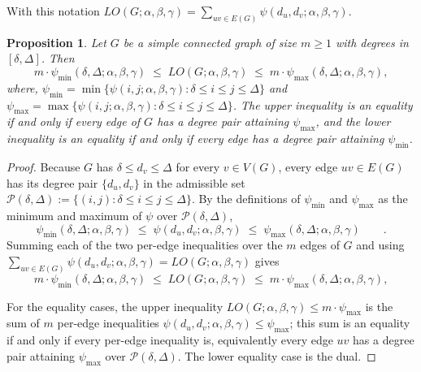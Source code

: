 \documentclass[a5paper, 10pt]{article}
\theoremstyle{plain}
\newtheorem{proposition}[theorem]{Proposition}
\theoremstyle{remark}
\theoremstyle{definition}
\newcommand{\Wuzi}{LO(G;\alpha,\beta,\gamma)}
\begin{document}
  With this notation $\Wuzi = \sum_{uv \in E(G)} \psi(d_u, d_v; \alpha,
  \beta, \gamma)$.

  \begin{proposition}\label{thm:bracket}
  Let $G$ be a simple connected graph of size $m \ge 1$ with
  degrees in $[\delta, \Delta]$. Then
  \begin{equation}\label{eq:bracket}
  m \cdot \psi_{\min}(\delta, \Delta; \alpha, \beta, \gamma)
  \;\le\; \Wuzi \;\le\;
  m \cdot \psi_{\max}(\delta, \Delta; \alpha, \beta, \gamma),
  \end{equation}
  where,
  $\psi_{\min} = \min\{\psi(i, j; \alpha, \beta, \gamma)
                : \delta \le i \le j \le \Delta\}$
  and $\psi_{\max} = \max\{\psi(i, j; \alpha, \beta, \gamma)
                : \delta \le i \le j \le \Delta\}$. The upper
  inequality is an equality if and only if every edge of $G$ has a
  degree pair attaining $\psi_{\max}$, and the lower
  inequality is an equality if and only if every edge has a degree
  pair attaining $\psi_{\min}$.
  \end{proposition}

  \begin{proof}
  Because $G$ has $\delta \le d_v \le \Delta$ for every
  $v \in V(G)$, every edge $uv \in E(G)$ has its degree
  pair $\{d_u, d_v\}$ in the admissible set
  $\mathcal{P}(\delta, \Delta) := \{(i, j) : \delta \le i \le j \le
  \Delta\}$.
  By the definitions of $\psi_{\min}$ and $\psi_{\max}$ as the
  minimum and maximum of $\psi$ over $\mathcal{P}(\delta, \Delta)$,
  \[
  \psi_{\min}(\delta, \Delta; \alpha, \beta, \gamma)
  \;\le\;
  \psi(d_u, d_v; \alpha, \beta, \gamma)
  \;\le\;
  \psi_{\max}(\delta, \Delta; \alpha, \beta, \gamma)
  \qquad. \]
  Summing each of the two per-edge inequalities over the $m$ edges
  of $G$ and using $\sum_{uv \in E(G)} \psi(d_u, d_v; \alpha, \beta,
  \gamma) = \Wuzi$
  gives
  \[
  m \cdot \psi_{\min}(\delta, \Delta; \alpha, \beta, \gamma)
  \;\le\;
  \Wuzi
  \;\le\;
  m \cdot \psi_{\max}(\delta, \Delta; \alpha, \beta, \gamma),
  \]

  For the equality cases, the upper inequality
  $\Wuzi \le m \cdot \psi_{\max}$ is the sum of $m$ per-edge
  inequalities $\psi(d_u, d_v; \alpha, \beta, \gamma) \le \psi_{\max}$;
  this sum is an equality if and only if every per-edge inequality
  is, equivalently every edge $uv$ has a degree pair attaining
  $\psi_{\max}$ over $\mathcal{P}(\delta, \Delta)$. The lower
  equality case is the dual.
  \end{proof}
\end{document}
